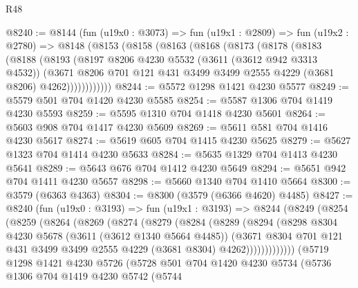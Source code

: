 \begin{lexlean}{R48}
\begin{coremodule}
@8240 := @8144
    (fun (u19x0 : @3073) =>
    fun (u19x1 : @2809) =>
    fun (u19x2 : @2780) =>
    @8148
      (@8153
        (@8158
          (@8163
            (@8168
              (@8173
                (@8178
                  (@8183
                    (@8188
                      (@8193
                        (@8197
                          @8206
                          @4230
                          @5532
                          (@3611 (@3612 @942 @3313 @4532))
                          (@3671
                            @8206
                            @701
                            @121
                            @431
                            @3499
                            @3499
                            @2555
                            @4229
                            (@3681 @8206)
                            @4262))))))))))))
@8244 := @5572 @1298 @1421 @4230 @5577
@8249 := @5579 @501 @704 @1420 @4230 @5585
@8254 := @5587 @1306 @704 @1419 @4230 @5593
@8259 := @5595 @1310 @704 @1418 @4230 @5601
@8264 := @5603 @908 @704 @1417 @4230 @5609
@8269 := @5611 @581 @704 @1416 @4230 @5617
@8274 := @5619 @605 @704 @1415 @4230 @5625
@8279 := @5627 @1323 @704 @1414 @4230 @5633
@8284 := @5635 @1329 @704 @1413 @4230 @5641
@8289 := @5643 @676 @704 @1412 @4230 @5649
@8294 := @5651 @942 @704 @1411 @4230 @5657
@8298 := @5660 @1340 @704 @1410 @5664
@8300 := @3579 (@6363 @4363)
@8304 := @8300 (@3579 (@6366 @4620) @4485)
@8427 := @8240
    (fun (u19x0 : @3193) =>
    fun (u19x1 : @3193) =>
    @8244
      (@8249
        (@8254
          (@8259
            (@8264
              (@8269
                (@8274
                  (@8279
                    (@8284
                      (@8289
                        (@8294
                          (@8298
                            @8304
                            @4230
                            @5678
                            (@3611 (@3612 @1340 @5664 @4485))
                            (@3671
                              @8304
                              @701
                              @121
                              @431
                              @3499
                              @3499
                              @2555
                              @4229
                              (@3681 @8304)
                              @4262)))))))))))))
    (@5719
      @1298
      @1421
      @4230
      @5726
      (@5728
        @501
        @704
        @1420
        @4230
        @5734
        (@5736
          @1306
          @704
          @1419
          @4230
          @5742
          (@5744

\end{coremodule}
\end{lexlean}
